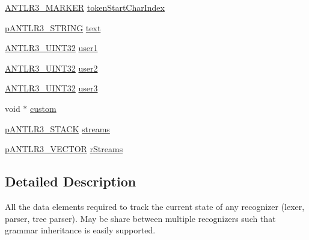 \begin{DoxyCompactItemize}
\item 
\hyperlink{antlr3defs_8h_a0361e6bf442e07afe923e4d05e9ebc4f}{A\-N\-T\-L\-R3\-\_\-\-M\-A\-R\-K\-E\-R} \hyperlink{struct_a_n_t_l_r3___r_e_c_o_g_n_i_z_e_r___s_h_a_r_e_d___s_t_a_t_e__struct_aa746ab83b70d8b5fdfce16175ad5da85}{token\-Start\-Char\-Index}
\item 
\hyperlink{antlr3interfaces_8h_a36bbe7362079348864db4b4dbdcce56b}{p\-A\-N\-T\-L\-R3\-\_\-\-S\-T\-R\-I\-N\-G} \hyperlink{struct_a_n_t_l_r3___r_e_c_o_g_n_i_z_e_r___s_h_a_r_e_d___s_t_a_t_e__struct_a2a40580da035969808c85674b821fa46}{text}
\item 
\hyperlink{antlr3defs_8h_ac41f744abd0fd25144b9eb9d11b1dfd1}{A\-N\-T\-L\-R3\-\_\-\-U\-I\-N\-T32} \hyperlink{struct_a_n_t_l_r3___r_e_c_o_g_n_i_z_e_r___s_h_a_r_e_d___s_t_a_t_e__struct_a66ef44cb1ffa25ff87a60d88451f5c51}{user1}
\item 
\hyperlink{antlr3defs_8h_ac41f744abd0fd25144b9eb9d11b1dfd1}{A\-N\-T\-L\-R3\-\_\-\-U\-I\-N\-T32} \hyperlink{struct_a_n_t_l_r3___r_e_c_o_g_n_i_z_e_r___s_h_a_r_e_d___s_t_a_t_e__struct_a5b44e050b05888eb6909ffd51dbd3843}{user2}
\item 
\hyperlink{antlr3defs_8h_ac41f744abd0fd25144b9eb9d11b1dfd1}{A\-N\-T\-L\-R3\-\_\-\-U\-I\-N\-T32} \hyperlink{struct_a_n_t_l_r3___r_e_c_o_g_n_i_z_e_r___s_h_a_r_e_d___s_t_a_t_e__struct_ae3c7d42c0c1d2b449aba5052b31008e6}{user3}
\item 
void $\ast$ \hyperlink{struct_a_n_t_l_r3___r_e_c_o_g_n_i_z_e_r___s_h_a_r_e_d___s_t_a_t_e__struct_ae46c93d1a97bfc10c0b6ca6aec8eea3c}{custom}
\item 
\hyperlink{antlr3interfaces_8h_acc1ac4dd91a4d941b628467ac08c0cea}{p\-A\-N\-T\-L\-R3\-\_\-\-S\-T\-A\-C\-K} \hyperlink{struct_a_n_t_l_r3___r_e_c_o_g_n_i_z_e_r___s_h_a_r_e_d___s_t_a_t_e__struct_a6215cb5ce99e66b0e4188883bd8d2d33}{streams}
\item 
\hyperlink{antlr3interfaces_8h_a0dfeeada7529fbe1b968be84079b828f}{p\-A\-N\-T\-L\-R3\-\_\-\-V\-E\-C\-T\-O\-R} \hyperlink{struct_a_n_t_l_r3___r_e_c_o_g_n_i_z_e_r___s_h_a_r_e_d___s_t_a_t_e__struct_a3d947576239c08c0edd4b91c8c452e93}{r\-Streams}
\end{DoxyCompactItemize}


\subsection{Detailed Description}
All the data elements required to track the current state of any recognizer (lexer, parser, tree parser). May be share between multiple recognizers such that grammar inheritance is easily supported. 

